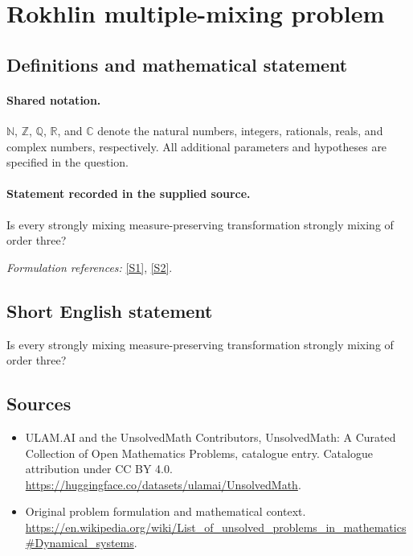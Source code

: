 \documentclass[11pt]{article}
\newcommand{\sref}[2]{\hyperlink{source:#1:#2}{[S#2]}}
\begin{document}
\section{Rokhlin multiple-mixing problem}\label{statement}

\subsection{Definitions and mathematical statement}

\paragraph{Shared notation.}$\mathbb N$, $\mathbb Z$, $\mathbb Q$, $\mathbb R$, and $\mathbb C$ denote the natural numbers, integers, rationals, reals, and complex numbers, respectively. All additional parameters and hypotheses are specified in the question.


\paragraph{Statement recorded in the supplied source.}
Is every strongly mixing measure-preserving transformation strongly mixing of order three?
\par\smallskip\textit{Formulation references:} \sref{statement}{1}, \sref{statement}{2}.
\subsection{Short English statement}
Is every strongly mixing measure-preserving transformation strongly mixing of order three?
\subsection{Sources}
\begin{itemize}
\item[\hypertarget{source:statement:1}{S1}] ULAM.AI and the UnsolvedMath Contributors, UnsolvedMath: A Curated Collection of Open Mathematics Problems, catalogue entry. Catalogue attribution under CC BY 4.0.
\url{https://huggingface.co/datasets/ulamai/UnsolvedMath}.
\item[\hypertarget{source:statement:2}{S2}] Original problem formulation and mathematical context.
\url{https://en.wikipedia.org/wiki/List_of_unsolved_problems_in_mathematics#Dynamical_systems}.
\end{itemize}
\label{end:statement}
\end{document}
